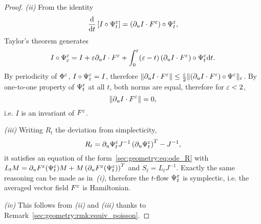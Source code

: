 \begin{proof}
%

\medskip\noindent%
\textit{(ii)}\indent%
From the identity 
\begin{equation*}
  \frac{\mathrm{d}}{\mathrm{d} t} \left[I \circ \Psi^{\varepsilon}_t\right] 
  = \left( \partial_u I \cdot F^{\varepsilon} \right) \circ \Psi^{\varepsilon}_t , 
\end{equation*}
Taylor's theorem generates 
\begin{equation*}
  I \circ \Psi^{\varepsilon}_{\varepsilon} 
  = I + \varepsilon \partial_u I \cdot F^{\varepsilon} + \int_0^{\varepsilon} (\varepsilon - t) 
    \left(\partial_u I \cdot F^{\varepsilon}\right) \circ \Psi^{\varepsilon}_t \mathrm{d} t .
\end{equation*}
By periodicity of $\Phi^{\varepsilon}$, $I \circ \Psi^{\varepsilon}_{\varepsilon} = I$, therefore $\|
\partial_u I \cdot F^{\varepsilon} \| \leq \frac{\varepsilon}{2} \| (\partial_u I \cdot F^{\varepsilon})
\circ \Psi^{\varepsilon} \|_{\varepsilon}$. By one-to-one property of $\Psi^{\varepsilon}_t$ at all
$t$, both norms are equal, therefore for $\varepsilon < 2$, 
\begin{equation*}
  \| \partial_u I \cdot F^{\varepsilon} \| = 0, 
\end{equation*}
i.e. $I$ is an invariant of $F^{\varepsilon}$. 

%

\medskip\noindent%
\textit{(iii)}\indent%
Writing $R_t$ the deviation from simplecticity, 
\begin{equation*}
  R_t = \partial_u \Psi_t^{\varepsilon} J^{-1} \left( \partial_u \Psi_t^{\varepsilon} \right) ^T 
  - J^{-1} ,
\end{equation*}
it satisfies an equation of the form~\eqref{sec:geometry:eq:ode_R} with
$L_t M = \partial_u F^{\varepsilon} ( \Psi_t^{\varepsilon} ) M + M \left( \partial_u F^{\varepsilon}
(\Psi_t^{\varepsilon} ) \right)^T $ and $S_t = L_t J^{-1}$. 
Exactly the same reasoning can be made as in~\textit{(i)}, therefore the
$t$-flow $\Psi^{\varepsilon}_t$ is symplectic, i.e. the averaged vector field
$F^{\varepsilon}$ is Hamiltonian. 

%

\medskip\noindent%
\textit{(iv)}\indent%
This follows from \textit{(ii)} and \textit{(iii)} thanks
to Remark~\ref{sec:geometry:rmk:equiv_poisson}. 

\end{proof}

